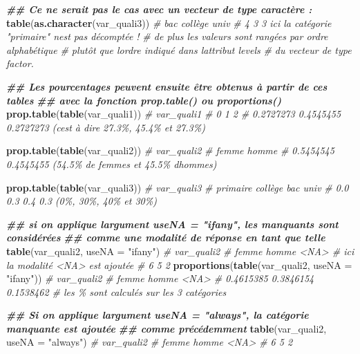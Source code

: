 \documentclass[
]{book}
\newenvironment{Shaded}{\begin{snugshade}}{\end{snugshade}}
\newcommand{\AttributeTok}[1]{\textcolor[rgb]{0.13,0.29,0.53}{#1}}
\newcommand{\CommentTok}[1]{\textcolor[rgb]{0.56,0.35,0.01}{\textit{#1}}}
\newcommand{\DocumentationTok}[1]{\textcolor[rgb]{0.56,0.35,0.01}{\textbf{\textit{#1}}}}
\newcommand{\FunctionTok}[1]{\textcolor[rgb]{0.13,0.29,0.53}{\textbf{#1}}}
\newcommand{\NormalTok}[1]{#1}
\newcommand{\StringTok}[1]{\textcolor[rgb]{0.31,0.60,0.02}{#1}}
\begin{document}
\begin{Shaded}
\begin{Highlighting}[]
\DocumentationTok{\#\# Ce ne serait pas le cas avec un vecteur de type caractère : }
\FunctionTok{table}\NormalTok{(}\FunctionTok{as.character}\NormalTok{(var\_quali3))}
\CommentTok{\# bac collège    univ }
\CommentTok{\#   4       3       3   ici la catégorie "primaire" n\textquotesingle{}est pas décomptée !}
\CommentTok{\#                       de plus les valeurs sont rangées par ordre alphabétique}
\CommentTok{\#                       plutôt que l\textquotesingle{}ordre indiqué dans l\textquotesingle{}attribut \textquotesingle{}levels\textquotesingle{}}
\CommentTok{\#                       du vecteur de type \textquotesingle{}factor\textquotesingle{}.}

\DocumentationTok{\#\# Les pourcentages peuvent ensuite être obtenus à partir de ces tables}
\DocumentationTok{\#\# avec la fonction prop.table() ou proportions()}
\FunctionTok{prop.table}\NormalTok{(}\FunctionTok{table}\NormalTok{(var\_quali1))}
\CommentTok{\# var\_quali1}
\CommentTok{\#         0         1         2 }
\CommentTok{\# 0.2727273 0.4545455 0.2727273   (c\textquotesingle{}est à dire 27.3\%, 45.4\% et 27.3\%)}

\FunctionTok{prop.table}\NormalTok{(}\FunctionTok{table}\NormalTok{(var\_quali2))}
\CommentTok{\# var\_quali2}
\CommentTok{\#     femme     homme }
\CommentTok{\# 0.5454545 0.4545455       (54.5\% de femmes et 45.5\% d\textquotesingle{}hommes)}

\FunctionTok{prop.table}\NormalTok{(}\FunctionTok{table}\NormalTok{(var\_quali3))}
\CommentTok{\# var\_quali3}
\CommentTok{\# primaire  collège      bac     univ }
\CommentTok{\#      0.0      0.3      0.4      0.3     (0\%, 30\%, 40\% et 30\%)}


\DocumentationTok{\#\# si on applique l\textquotesingle{}argument useNA = "ifany", les manquants sont considérées}
\DocumentationTok{\#\# comme une modalité de réponse en tant que telle}
\FunctionTok{table}\NormalTok{(var\_quali2, }\AttributeTok{useNA =} \StringTok{"ifany"}\NormalTok{)}
\CommentTok{\# var\_quali2}
\CommentTok{\# femme homme  \textless{}NA\textgreater{}    \# ici la modalité \textless{}NA\textgreater{} est ajoutée}
\CommentTok{\#     6     5     2}
\FunctionTok{proportions}\NormalTok{(}\FunctionTok{table}\NormalTok{(var\_quali2, }\AttributeTok{useNA =} \StringTok{"ifany"}\NormalTok{))}
\CommentTok{\# var\_quali2}
\CommentTok{\#     femme     homme      \textless{}NA\textgreater{}}
\CommentTok{\# 0.4615385 0.3846154 0.1538462 \# les \% sont calculés sur les 3 catégories}

\DocumentationTok{\#\# Si on applique l\textquotesingle{}argument useNA = "always", la catégorie manquante est ajoutée}
\DocumentationTok{\#\# comme précédemment}
\FunctionTok{table}\NormalTok{(var\_quali2, }\AttributeTok{useNA =} \StringTok{"always"}\NormalTok{)}
\CommentTok{\# var\_quali2}
\CommentTok{\# femme homme  \textless{}NA\textgreater{} }
\CommentTok{\#     6     5     2}


\end{Highlighting}
\end{Shaded}
\end{document}
